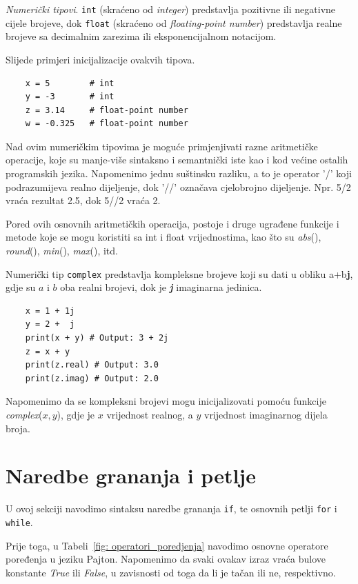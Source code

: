 \textit{Numerički tipovi}. \texttt{int} (skraćeno od \textit{integer}) predstavlja pozitivne ili negativne cijele brojeve, dok \texttt{float} (skraćeno od \textit{floating-point number})  predstavlja realne brojeve sa decimalnim zarezima ili eksponencijalnom notacijom.

Slijede primjeri inicijalizacije ovakvih tipova. 

\begin{verbatim}
	x = 5        # int 
	y = -3       # int 
	z = 3.14     # float-point number
	w = -0.325   # float-point number
\end{verbatim}

Nad ovim numeričkim tipovima  je moguće primjenjivati razne aritmetičke operacije, koje su manje-više sintaksno i semantnički iste kao i kod većine ostalih programskih jezika. Napomenimo jednu suštinsku razliku, a to je operator '/' koji podrazumijeva realno dijeljenje, dok '//' označava cjelobrojno dijeljenje. Npr. 5/2 vraća rezultat 2.5, dok 5//2 vraća 2.  

Pored ovih osnovnih aritmetičkih operacija, postoje i druge ugrađene funkcije i metode koje se mogu koristiti sa int i float vrijednostima, kao što su \textit{abs}(), \textit{round}(), \textit{min}(), \textit{max}(), itd.

Numerički tip \texttt{complex} predstavlja kompleksne brojeve koji su dati u obliku a+b\textbf{j}, gdje su $a$ i $b$ oba realni brojevi, dok je  \textbf{\textit{j}} imaginarna jedinica.
\begin{verbatim}
	x = 1 + 1j 
	y = 2 +  j 
	print(x + y) # Output: 3 + 2j
	z = x + y
	print(z.real) # Output: 3.0
	print(z.imag) # Output: 2.0
\end{verbatim}
Napomenimo da se kompleksni brojevi mogu inicijalizovati pomoću funkcije  \textit{complex}($x, y$), gdje je $x$ vrijednost realnog, a $y$ vrijednost imaginarnog dijela broja. 


\section{Naredbe grananja i petlje}
U ovoj sekciji navodimo sintaksu naredbe grananja \texttt{if}, te osnovnih petlji \texttt{for} i \texttt{while}. 

Prije toga, u Tabeli~\ref{fig: operatori_poredjenja} navodimo osnovne operatore poređenja u jeziku Pajton. Napomenimo da svaki ovakav izraz vraća bulove konstante \emph{True} ili \emph{False}, u zavisnosti od toga da li je tačan ili ne, respektivno. 

